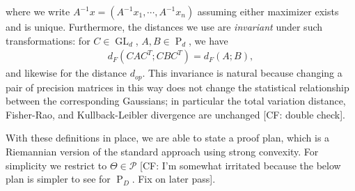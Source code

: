 \documentclass[aos]{imsart}
\theoremstyle{definition}
\DeclareMathOperator{\GL}{GL}
\DeclareMathOperator{\tr}{Tr}
\DeclarePairedDelimiter{\norm}{\lVert}{\rVert}
\renewcommand{\vec}{\bm}
\newcommand{\PD}{\operatorname{P}}
\newcommand{\SPD}{\mathcal{P}}
\newcommand{\samp}{x}
\newcommand{\CF}[1]{{\color{purple}[CF: #1]}}
\newcommand{\MW}[1]{{\color{red}[MW: #1]}}
\begin{document}
where we write $A^{-1} \samp = (A^{-1} \samp_1,\cdots,A^{-1} \samp_n)$
 assuming either maximizer exists and is unique. Furthermore, the distances we use are \emph{invariant} under such transformations: for $C \in \GL_d$, $A, B \in \PD_d$, we have
 \begin{align*}
  d_F(C A C^T; C B C^T)
= d_F(A; B),
\end{align*}
and likewise for the distance $d_{op}$. This invariance is natural because changing a pair of precision matrices in this way does not change the statistical relationship between the corresponding Gaussians; in particular the total variation distance, Fisher-Rao, and Kullback-Leibler divergence are unchanged \CF{double check}.



With these definitions in place, we are able to state a proof plan, which is a Riemannian version of the standard approach using strong convexity. For simplicity we restrict to $\Theta \in \SPD$ \CF{I'm somewhat irritated because the below plan is simpler to see for $\PD_D$. Fix on later pass}.
\end{document}
